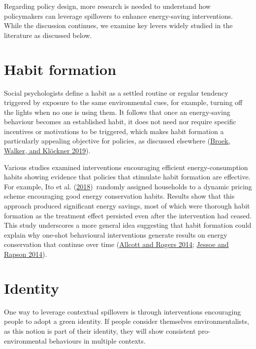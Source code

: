 \documentclass[
  12pt,
  captions=heading]{scrreport}
\begin{document}
Regarding policy design, more research is needed to understand how
policymakers can leverage spillovers to enhance energy-saving
interventions. While the discussion continues, we examine key levers
widely studied in the literature as discussed below.

\hypertarget{habit-formation}{%
\section{Habit formation}\label{habit-formation}}

Social psychologists define a habit as a settled routine or regular
tendency triggered by exposure to the same environmental cues, for
example, turning off the lights when no one is using them. It follows
that once an energy-saving behaviour becomes an established habit, it
does not need nor require specific incentives or motivations to be
triggered, which makes habit formation a particularly appealing
objective for policies, as discussed elsewhere
(\protect\hyperlink{ref-van2019drivers}{Broek, Walker, and Klöckner
2019}).

Various studies examined interventions encouraging efficient
energy-consumption habits showing evidence that policies that stimulate
habit formation are effective. For example, Ito et al.
(\protect\hyperlink{ref-ito2018moral}{2018})~randomly assigned
households to a dynamic pricing scheme encouraging good energy
conservation habits. Results show that this approach produced
significant energy savings, most of which were thorough habit formation
as the treatment effect persisted even after the intervention had
ceased. This study underscores a more general idea suggesting that habit
formation could explain why one-shot behavioural interventions generate
results on energy conservation that continue over time
(\protect\hyperlink{ref-allcott2014short}{Allcott and Rogers 2014};
\protect\hyperlink{ref-jessoe2014knowledge}{Jessoe and Rapson 2014}).

\hypertarget{identity}{%
\section{Identity}\label{identity}}

One way to leverage contextual spillovers is through interventions
encouraging people to adopt a green identity. If people consider
themselves environmentalists, as this notion is part of their identity,
they will show consistent pro-environmental behaviours in multiple
contexts.
\end{document}
